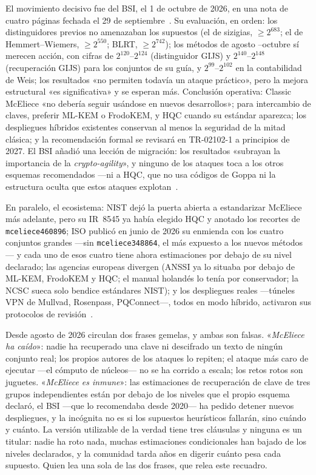 El movimiento decisivo fue del BSI, el 1 de octubre de 2026, en una
nota de cuatro páginas fechada el 29 de septiembre~\cite{bsi2026}.
Su evaluación, en orden: los distinguidores previos no amenazaban
los supuestos (el de sizigias, $\ge 2^{683}$; el de
Hemmert--Wiemers, $\ge 2^{550}$; BLRT, $\ge 2^{742}$); los métodos
de agosto --octubre sí merecen acción, con cifras de $2^{120}$--$2^{124}$
(distinguidor GIJS) y $2^{140}$--$2^{148}$ (recuperación GIJS) para
los conjuntos de su guía, y $2^{99}$--$2^{102}$ en la contabilidad
de Weis; los resultados «no permiten todavía un ataque práctico»,
pero la mejora estructural «es significativa» y se esperan más.
Conclusión operativa: Classic McEliece «no debería seguir usándose
en nuevos desarrollos»; para intercambio de claves, preferir
ML-KEM o FrodoKEM, y HQC cuando su estándar aparezca; los
despliegues híbridos existentes conservan al menos la seguridad de
la mitad clásica; y la recomendación formal se revisará en
TR-02102-1 a principios de 2027. El BSI añadió una lección de
migración: los resultados «subrayan la importancia de la
\emph{crypto-agility}», y ninguno de los ataques toca a los otros
esquemas recomendados ---ni a HQC, que no usa códigos de Goppa ni la estructura
oculta que estos ataques explotan~\cite{bsi2026}.

En paralelo, el ecosistema: NIST dejó la puerta abierta a
estandarizar McEliece más adelante, pero su IR~8545 ya había
elegido HQC y anotado los recortes de \texttt{mceliece460896}; ISO
publicó en junio de 2026 su enmienda con los cuatro conjuntos
grandes ---sin \texttt{mceliece348864}, el más expuesto a los
nuevos métodos--- y cada uno de esos cuatro tiene ahora
estimaciones por debajo de su nivel declarado; las agencias
europeas divergen (ANSSI ya lo situaba por debajo de ML-KEM,
FrodoKEM y HQC; el manual holandés lo tenía por conservador; la
NCSC sueca solo bendice estándares NIST); y los despliegues reales
---túneles VPN de Mullvad, Rosenpass, PQConnect---, todos en modo
híbrido, activaron sus protocolos de revisión~\cite{bernstein2026,bsi2026,nist8545}.

\begin{trampa}
Desde agosto de 2026 circulan dos frases gemelas, y ambas son
falsas. «\emph{McEliece ha caído}»: nadie ha recuperado una clave
ni descifrado un texto de ningún conjunto real; los propios
autores de los ataques lo repiten; el ataque más caro de ejecutar
---el cómputo de núcleos--- no se ha corrido a escala; los retos
rotos son juguetes. «\emph{McEliece es inmune}»: las estimaciones
de recuperación de clave de tres grupos independientes están por
debajo de los niveles que el propio esquema declaró, el BSI ---que
lo recomendaba desde 2020--- ha pedido detener nuevos despliegues,
y la incógnita no es si los supuestos heurísticos fallarán, sino
cuándo y cuánto. La versión utilizable de la verdad tiene tres
cláusulas y ninguna es un titular: nadie ha roto nada, muchas
estimaciones condicionales han bajado de los niveles declarados, y
la comunidad tarda años en digerir cuánto pesa cada supuesto. Quien
lea una sola de las dos frases, que relea este recuadro.
\end{trampa}

